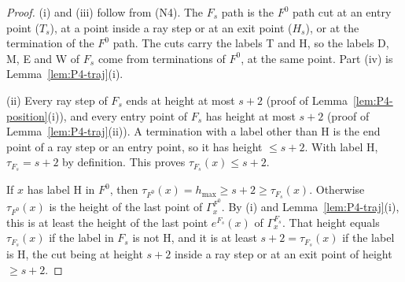 \documentclass[11pt]{amsart}
\newcommand{\hmax}{h_{\max}}
\newcommand{\Fz}{F^{0}}
\newcommand{\Fs}{F_{s}}
\theoremstyle{definition}
\theoremstyle{remark}
\numberwithin{equation}{section}
\begin{document}
\begin{proof}
(i) and (iii) follow from (N4). The $\Fs$ path is the $\Fz$ path cut at an entry point ($T_s$), at a point inside a ray step or at an exit point ($H_s$), or at the termination of the $\Fz$ path. The cuts carry the labels T and H, so the labels D, M, E and W of $\Fs$ come from terminations of $\Fz$, at the same point. Part (iv) is Lemma~\ref{lem:P4-traj}(i).

(ii) Every ray step of $\Fs$ ends at height at most $s+2$ (proof of Lemma~\ref{lem:P4-position}(i)), and every entry point of $\Fs$ has height at most $s+2$ (proof of Lemma~\ref{lem:P4-traj}(ii)). A termination with a label other than H is the end point of a ray step or an entry point, so it has height $\le s+2$. With label H, $\tau_{\Fs}=s+2$ by definition. This proves $\tau_{\Fs}(x)\le s+2$.

If $x$ has label H in $\Fz$, then $\tau_{\Fz}(x)=\hmax\ge s+2\ge\tau_{\Fs}(x)$. Otherwise $\tau_{\Fz}(x)$ is the height of the last point of $\Gamma^{\Fz}_x$. By (i) and Lemma~\ref{lem:P4-traj}(i), this is at least the height of the last point $e^{\Fs}(x)$ of $\Gamma^{\Fs}_x$. That height equals $\tau_{\Fs}(x)$ if the label in $\Fs$ is not H, and it is at least $s+2=\tau_{\Fs}(x)$ if the label is H, the cut being at height $s+2$ inside a ray step or at an exit point of height $\ge s+2$.
\end{proof}
\end{document}
